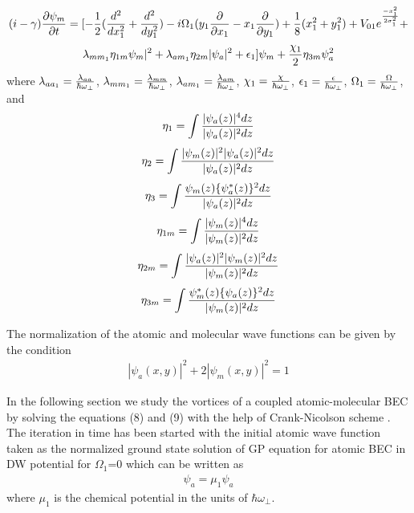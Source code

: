 \documentclass[10pt,a4paper]{article}
\begin{document}
$$(i-\gamma){\partial\psi_m\over
\partial t}=[-{1\over 2}({d^2\over dx_1^2}+{d^2\over dy_1^2})-i\Omega_1(y_1{\partial\over \partial x_1}-x_1{\partial \over \partial y_1})
+{1\over 8}(x_1^2+y_1^2)+V_{01}e^{-x_1^2\over 2 \sigma_1^2}+$$
\begin{eqnarray}{\lambda_{mm_1}}\eta_{1m}\psi_m|^2+\lambda_{am_1}\eta_{2m}|\psi_a|^2+\epsilon_1]\psi_m
+{\chi_1\over 2}\eta_{3m}\psi_a^2\end{eqnarray} where
$\lambda_{aa_1}={\lambda_{aa}\over \hbar \omega_\perp}$,
$\lambda_{mm_1}={\lambda_{mm}\over \hbar \omega_\perp}$,
$\lambda_{am_1}={\lambda_{am}\over \hbar \omega_\perp}$,
$\chi_1={\chi\over \hbar\omega_\perp}$, $\epsilon_1={\epsilon\over
\hbar\omega_\perp}$, $\Omega_1={\Omega\over \hbar \omega_\perp}$,
and
\begin{eqnarray}
\eta_1={\int{|\psi_a(z)|^4dz\over |\psi_a(z)|^2dz}}
\end{eqnarray}
\begin{eqnarray}
\eta_2={\int{|\psi_m(z)|^2 |\psi_a(z)|^2dz\over |\psi_a(z)|^2dz}}
\end{eqnarray}
\begin{eqnarray}
\eta_3={\int{\psi_m(z) \{\psi_a^*(z)\}^2dz\over |\psi_a(z)|^2dz}}
\end{eqnarray}
\begin{eqnarray}
\eta_{1m}={\int{|\psi_m(z)|^4dz\over |\psi_m(z)|^2dz}}
\end{eqnarray}
\begin{eqnarray}
\eta_{2m}={\int{|\psi_a(z)|^2 |\psi_m(z)|^2dz\over
|\psi_m(z)|^2dz}}
\end{eqnarray}
\begin{eqnarray}
\eta_{3m}={\int{\psi_m^*(z) \{\psi_a(z)\}^2dz\over
|\psi_m(z)|^2dz}}
\end{eqnarray}

The normalization of the atomic and molecular wave functions can
be given by the condition
\begin{eqnarray}
|\psi_a(x,y)|^2+2|\psi_m(x,y)|^2=1
\end{eqnarray}

In the following section we study the vortices of a coupled
atomic-molecular BEC by solving the equations (8) and (9) with the
help of Crank-Nicolson scheme \cite{M3, M4}. The iteration in time
has been started with the initial atomic wave function taken as
the normalized ground state solution of GP equation for atomic BEC
in DW potential for $\Omega_1$=0 which can be written as
\begin{eqnarray}[-({d^2\over dx_1^2}+{d^2\over dy_1^2})
+{1\over 4}(x_1^2+y_1^2)+V_{01}e^{-x_1^2\over 2 \sigma_1^2}+
{\lambda_{a_1}}\eta_1|\psi_a|^2]\psi_a =\mu_1\psi_a\end{eqnarray}
where $\mu_1$ is the chemical potential in the units of
$\hbar\omega_\perp$.
\end{document}
